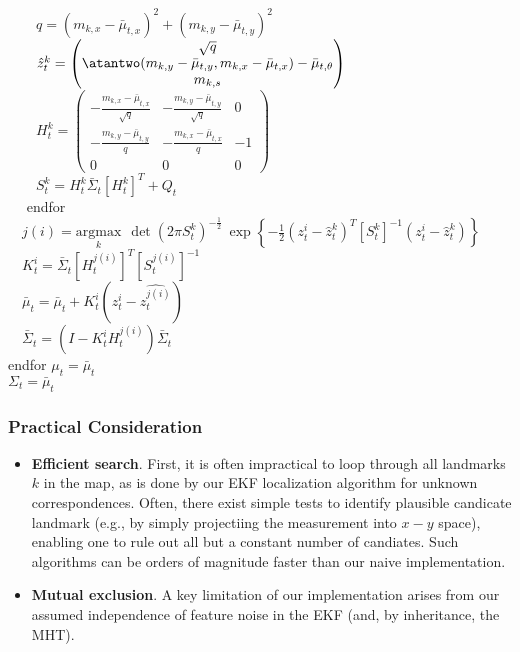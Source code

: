 \begin{algorithm}[H]
$\qquad q = (m_{k,x} - \bar{\mu}_{t,x})^2 + (m_{k,y} - \bar{\mu}_{t,y})^2$\\
\BlankLine
$\qquad \hat{z}_t^k = \begin{pmatrix} \sqrt{q} \\ \atantwo (m_{k,y} - \bar{\mu}_{t,y}, m_{k,x} - \bar{\mu}_{t,x}) - \bar{\mu}_{t, \theta} \\ m_{k,s} \end{pmatrix}$ \\
\BlankLine
$\qquad H_t^k = \begin{pmatrix} -\frac{m_{k,x} - \bar{\mu}_{t,x}}{\sqrt{q}} & -\frac{m_{k,y} - \bar{\mu}_{t,y}}{\sqrt{q}} & 0 \\
                                -\frac{m_{k,y} - \bar{\mu}_{t,y}}{{q}} & -\frac{m_{k,x} - \bar{\mu}_{t,x}}{{q}} & -1  \\
                               0 & 0 & 0 \end{pmatrix}$ \\
\BlankLine
$\qquad S_t^k = H_t^k \bar{\Sigma}_t [H_t^k]^T + Q_t$\\

$\quad$ endfor \\

\BlankLine
$\quad j(i) = \underset{k}{\text{argmax}} \ \ \det(2\pi S_t^k)^{-\frac{1}{2}} \ \exp \left\{-\frac{1}{2} (z_t^i - \hat{z}_t^k)^T [S_t^k]^{-1} (z_t^i - \hat{z}_t^k)\right\}$\\
$\quad K_t^i = \bar{\Sigma}_t [H_t^{j(i)}]^T [S_t^{j(i)}]^{-1}$\\
$\quad \bar{\mu}_t = \bar{\mu}_t + K_t^i (z_t^i - \hat{z_t^{j(i)}})$\\
$\quad \bar{\Sigma}_t = (I - K_t^i H_t^{j(i)}) \bar{\Sigma}_t$ \\
endfor
\BlankLine
$\mu_t = \bar{\mu}_t$\\
$\Sigma_t = \bar{\mu}_t$\\
\BlankLine
\BlankLine
{}
\end{algorithm}

\newpage

\subsubsection{Practical Consideration}
\begin{itemize}
  \item \textbf{Efficient search}. First, it is often impractical to loop through all landmarks $k$ in the map, as is done by our EKF localization algorithm for unknown correspondences.
   Often, there exist simple tests to identify plausible candicate landmark (e.g., by simply projectiing the measurement into $x-y$ space), enabling one to rule out all but a constant
   number of candiates. Such algorithms can be orders of magnitude faster than our naive implementation.

  \item \textbf{Mutual exclusion}. A key limitation of our implementation arises from our assumed independence of feature noise in the EKF (and, by inheritance, the MHT).

\end{itemize}



